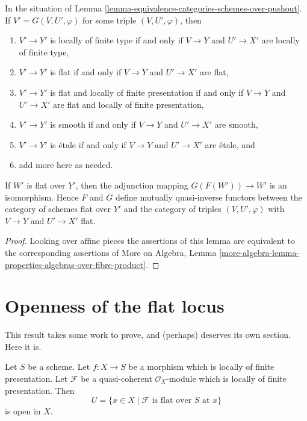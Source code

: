 \begin{lemma}
\label{lemma-equivalence-categories-schemes-over-pushout-flat}
In the situation of
Lemma \ref{lemma-equivalence-categories-schemes-over-pushout}.
If $V' = G(V, U', \varphi)$ for some triple $(V, U', \varphi)$, then
\begin{enumerate}
\item $V' \to Y'$ is locally of finite type if and only if $V \to Y$ and
$U' \to X'$ are locally of finite type,
\item $V' \to Y'$ is flat if and only if $V \to Y$ and $U' \to X'$ are flat,
\item $V' \to Y'$ is flat and locally of finite presentation if and only if
$V \to Y$ and $U' \to X'$ are flat and locally of finite presentation,
\item $V' \to Y'$ is smooth if and only if $V \to Y$ and $U' \to X'$ are smooth,
\item $V' \to Y'$ is \'etale if and only if $V \to Y$ and $U' \to X'$
are \'etale, and
\item add more here as needed.
\end{enumerate}
If $W'$ is flat over $Y'$, then the adjunction mapping
$G(F(W')) \to W'$ is an isomorphism. Hence $F$ and $G$ define mutually
quasi-inverse functors between the category of schemes flat over $Y'$
and the category of triples $(V, U', \varphi)$ with $V \to Y$
and $U' \to X'$ flat.
\end{lemma}

\begin{proof}
Looking over affine pieces the assertions of this lemma
are equivalent to the corresponding assertions of
More on Algebra, Lemma
\ref{more-algebra-lemma-properties-algebras-over-fibre-product}.
\end{proof}







\section{Openness of the flat locus}
\label{section-open-flat}

\noindent
This result takes some work to prove, and (perhaps)
deserves its own section. Here it is.

\begin{theorem}
\label{theorem-openness-flatness}
\begin{reference}
\cite[IV Theorem 11.3.1]{EGA}
\end{reference}
Let $S$ be a scheme.
Let $f : X \to S$ be a morphism which is locally of finite presentation.
Let $\mathcal{F}$ be a quasi-coherent $\mathcal{O}_X$-module which is
locally of finite presentation. Then
$$
U = \{x \in X \mid \mathcal{F}\text{ is flat over }S\text{ at }x\}
$$
is open in $X$.
\end{theorem}

